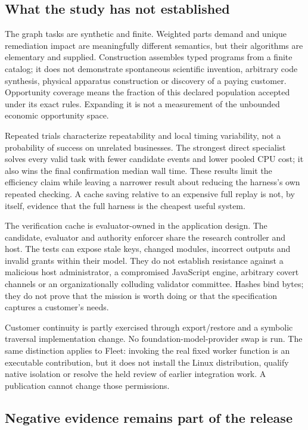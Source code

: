 \documentclass[11pt]{article}
\begin{document}
\subsection{What the study has not established}

The graph tasks are synthetic and finite. Weighted parts demand and unique remediation impact are meaningfully different semantics, but their algorithms are elementary and supplied. Construction assembles typed programs from a finite catalog; it does not demonstrate spontaneous scientific invention, arbitrary code synthesis, physical apparatus construction or discovery of a paying customer. Opportunity coverage means the fraction of this declared population accepted under its exact rules. Expanding it is not a measurement of the unbounded economic opportunity space.

Repeated trials characterize repeatability and local timing variability, not a probability of success on unrelated businesses. The strongest direct specialist solves every valid task with fewer candidate events and lower pooled CPU cost; it also wins the final confirmation median wall time. These results limit the efficiency claim while leaving a narrower result about reducing the harness's own repeated checking. A cache saving relative to an expensive full replay is not, by itself, evidence that the full harness is the cheapest useful system.

The verification cache is evaluator-owned in the application design. The candidate, evaluator and authority enforcer share the research controller and host. The tests can expose stale keys, changed modules, incorrect outputs and invalid grants within their model. They do not establish resistance against a malicious host administrator, a compromised JavaScript engine, arbitrary covert channels or an organizationally colluding validator committee. Hashes bind bytes; they do not prove that the mission is worth doing or that the specification captures a customer's needs.

Customer continuity is partly exercised through export/restore and a symbolic traversal implementation change. No foundation-model-provider swap is run. The same distinction applies to Fleet: invoking the real fixed worker function is an executable contribution, but it does not install the Linux distribution, qualify native isolation or resolve the held review of earlier integration work. A publication cannot change those permissions.

\subsection{Negative evidence remains part of the release}
\end{document}
